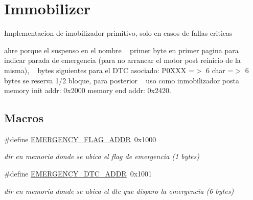 \hypertarget{group__Immobilizer}{}\section{Immobilizer}
\label{group__Immobilizer}


Implementacion de imobilizador primitivo, solo en casos de fallas criticas 

ahre porque el suspenso en el nombre ~\newline
primer byte en primer pagina para indicar parada de emergencia (para no arrancar el motor post reinicio de la misma), ~ bytes siguientes para el D\+TC asociado\+: P0\+X\+XX =$>$ 6 char =$>$ 6 bytes se reserva 1/2 bloque, para posterior ~\newline
 uso como inmobilizador posta memory init addr\+: 0x2000 memory end addr\+: 0x2420.  


\subsection*{Macros}
\begin{DoxyCompactItemize}
\item 
\mbox{\label{group__Immobilizer_ga2e4b52d4dfc434276aa96faaca8372b9}} 
\#define \hyperlink{group__Immobilizer_ga2e4b52d4dfc434276aa96faaca8372b9}{E\+M\+E\+R\+G\+E\+N\+C\+Y\+\_\+\+F\+L\+A\+G\+\_\+\+A\+D\+DR}~0x1000
\begin{DoxyCompactList}\small\item\em dir en memoria donde se ubica el flag de emergencia (1 bytes) \end{DoxyCompactList}\item 
\mbox{\label{group__Immobilizer_ga683a9087887bf34cde108cca639a0571}} 
\#define \hyperlink{group__Immobilizer_ga683a9087887bf34cde108cca639a0571}{E\+M\+E\+R\+G\+E\+N\+C\+Y\+\_\+\+D\+T\+C\+\_\+\+A\+D\+DR}~0x1001
\begin{DoxyCompactList}\small\item\em dir en memoria donde se ubica el dtc que disparo la emergencia (6 bytes) \end{DoxyCompactList}\end{DoxyCompactItemize}

